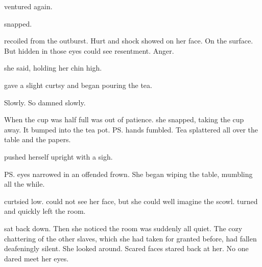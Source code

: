 
 \Piacet{} ventured again.

 \Tiroco{} snapped. 

\Piacet{} recoiled from the outburst. 
Hurt and shock showed on her face. 
On the surface. 
But hidden in those eyes \Tiroco{} could see resentment. 
Anger. 


 she said, holding her chin high. 

\Piacet{} gave a slight curtsy and began pouring the tea. 

Slowly. 
So damned slowly. 

When the cup was half full \Tiroco{} was out of patience. 
 she snapped, taking the cup away. 
It bumped into the tea pot. 
\ps{\Piacet}{} hands fumbled. 
Tea splattered all over the table and the papers. 

\Tiroco{} pushed herself upright with a sigh. 

\ps{\Piacet}{} eyes narrowed in an offended frown. 
She began wiping the table, mumbling all the while. 


\Piacet{} curtsied low. 
\Tiroco{} could not see her face, but she could well imagine the scowl. 
\Piacet{} turned and quickly left the room. 


\Tiroco{} sat back down. 
Then she noticed the room was suddenly all quiet. 
The cozy chattering of the other slaves, which she had taken for granted before, had fallen deafeningly silent. 
She looked around. 
Scared faces stared back at her. 
No one dared meet her eyes. 

